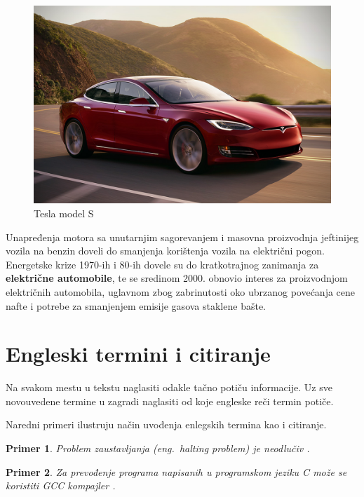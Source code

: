 \documentclass[a4paper]{article}
\newtheorem{primer}{Primer}[section]
\begin{document}
\begin{figure}[h]
        \centering
        \includegraphics[width=\linewidth]{tesla.jpeg}
        \caption{Tesla model S}
        \label{fig:my_label}
        \end{figure}
        Unapređenja motora sa unutarnjim sagorevanjem i masovna proizvodnja jeftinijeg vozila na benzin doveli do smanjenja korištenja vozila na električni pogon.
         Energetske krize 1970-ih i 80-ih dovele su do kratkotrajnog zanimanja za \textbf{električne automobile}, te se sredinom 2000. obnovio interes za proizvodnjom električnih automobila, uglavnom zbog zabrinutosti oko ubrzanog povećanja cene nafte i potrebe za smanjenjem emisije gasova staklene bašte.
         
\label{sec:uvod}

\section{Engleski termini i citiranje}	
\label{sec:termini_i_citiranje}

Na svakom mestu u tekstu naglasiti odakle tačno potiču informacije. Uz sve novouvedene termine u zagradi naglasiti od koje engleske reči termin potiče. 

Naredni primeri ilustruju način uvođenja enlegskih termina kao i citiranje.

\begin{primer}
Problem zaustavljanja (eng.~{\em halting problem}) je neodlučiv \cite{haltingproblem}.
\end{primer}

\begin{primer}
Za prevođenje programa napisanih u programskom jeziku C može se koristiti GCC kompajler \cite{gcc}.
\end{primer}
\end{document}
